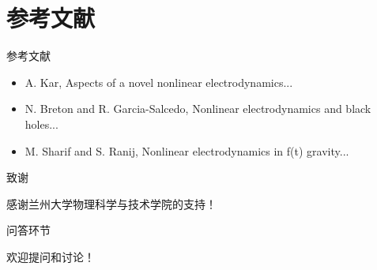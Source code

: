 \documentclass{beamer}
\begin{document}
\section{参考文献}
\begin{frame}{参考文献}
\begin{itemize}
    \item A. Kar, Aspects of a novel nonlinear electrodynamics...
    \item N. Breton and R. Garcia-Salcedo, Nonlinear electrodynamics and black holes...
    \item M. Sharif and S. Ranij, Nonlinear electrodynamics in f(t) gravity...
\end{itemize}
\end{frame}

\begin{frame}{致谢}
\begin{center}
    \Large 感谢兰州大学物理科学与技术学院的支持！
\end{center}
\end{frame}

\begin{frame}{问答环节}
\begin{center}
    \Large 欢迎提问和讨论！
\end{center}
\end{frame}
\end{document}
